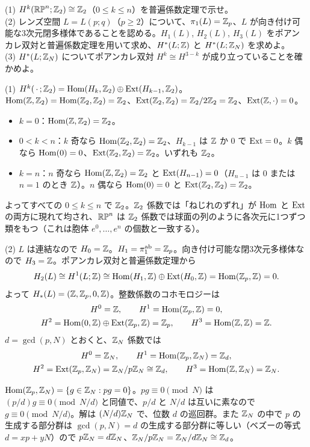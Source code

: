 \begin{problem}[難易度 B]\label{ch06-prob-lens}
(1) $H^k(\RP^n;\Z_2)\cong\Z_2$（$0\le k\le n$）を普遍係数定理で示せ。\\
(2) レンズ空間 $L=L(p;q)$（$p\ge2$）について、$\pi_1(L)=\Z_p$、$L$ が向き付け可能な3次元閉多様体であることを認める。$H_1(L)$, $H_2(L)$, $H_3(L)$ をポアンカレ双対と普遍係数定理を用いて求め、$H^*(L;\Z)$ と $H^*(L;\Z_N)$ を求めよ。\\
(3) $H^*(L;\Z_N)$ についてポアンカレ双対 $H^k\cong H^{3-k}$ が成り立っていることを確かめよ。
\end{problem}

\begin{solution}
(1) $H^k(\,\cdot\,;\Z_2)=\Hom(H_k,\Z_2)\oplus\Ext(H_{k-1},\Z_2)$。$\Hom(\Z,\Z_2)=\Hom(\Z_2,\Z_2)=\Z_2$、$\Ext(\Z_2,\Z_2)=\Z_2/2\Z_2=\Z_2$、$\Ext(\Z,\cdot)=0$。
\begin{itemize}
\item $k=0$：$\Hom(\Z,\Z_2)=\Z_2$。
\item $0<k<n$：$k$ 奇なら $\Hom(\Z_2,\Z_2)=\Z_2$、$H_{k-1}$ は $\Z$ か $0$ で $\Ext=0$。$k$ 偶なら $\Hom(0)=0$、$\Ext(\Z_2,\Z_2)=\Z_2$。いずれも $\Z_2$。
\item $k=n$：$n$ 奇なら $\Hom(\Z,\Z_2)=\Z_2$ と $\Ext(H_{n-1})=0$（$H_{n-1}$ は $0$ または $n=1$ のとき $\Z$）。$n$ 偶なら $\Hom(0)=0$ と $\Ext(\Z_2,\Z_2)=\Z_2$。
\end{itemize}
よってすべての $0\le k\le n$ で $\Z_2$。$\Z_2$ 係数では「ねじれのずれ」が $\Hom$ と $\Ext$ の両方に現れて均され、$\RP^n$ は $\Z_2$ 係数では球面の列のように各次元に1つずつ類をもつ（これは胞体 $e^0,\dots,e^n$ の個数と一致する）。

(2) $L$ は連結なので $H_0=\Z$。$H_1=\pi_1^{\mathrm{ab}}=\Z_p$。向き付け可能な閉3次元多様体なので $H_3=\Z$。ポアンカレ双対と普遍係数定理から
\[
H_2(L)\cong H^1(L;\Z)\cong\Hom(H_1,\Z)\oplus\Ext(H_0,\Z)=\Hom(\Z_p,\Z)=0.
\]
よって $H_*(L)=(\Z,\Z_p,0,\Z)$。整数係数のコホモロジーは
\[
\begin{gathered}
H^0=\Z,\qquad H^1=\Hom(\Z_p,\Z)=0,\\
H^2=\Hom(0,\Z)\oplus\Ext(\Z_p,\Z)=\Z_p,\qquad H^3=\Hom(\Z,\Z)=\Z.
\end{gathered}
\]
$d=\gcd(p,N)$ とおくと、$\Z_N$ 係数では
\[
\begin{gathered}
H^0=\Z_N,\qquad H^1=\Hom(\Z_p,\Z_N)=\Z_d,\\
H^2=\Ext(\Z_p,\Z_N)=\Z_N/p\Z_N\cong\Z_d,\qquad H^3=\Hom(\Z,\Z_N)=\Z_N.
\end{gathered}
\]
\begin{note}
$\Hom(\Z_p,\Z_N)=\{g\in\Z_N:pg=0\}$。$pg\equiv0\pmod N$ は $(p/d)g\equiv0\pmod{N/d}$ と同値で、$p/d$ と $N/d$ は互いに素なので $g\equiv0\pmod{N/d}$。解は $(N/d)\Z_N$ で、位数 $d$ の巡回群。また $\Z_N$ の中で $p$ の生成する部分群は $\gcd(p,N)=d$ の生成する部分群に等しい（ベズーの等式 $d=xp+yN$）ので $p\Z_N=d\Z_N$、$\Z_N/p\Z_N=\Z_N/d\Z_N\cong\Z_d$。
\end{note}


\end{solution}
